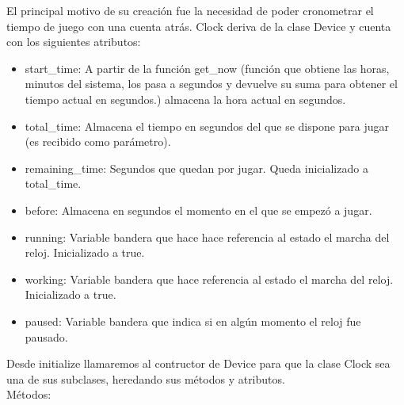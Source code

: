El principal motivo de su creación fue la necesidad de poder cronometrar el tiempo de juego con una cuenta atrás.
Clock deriva de la clase Device y cuenta con los siguientes atributos:

\begin{itemize}
 \item start\_time: A partir de la función get\_now (función que obtiene las horas, minutos del sistema, los pasa a segundos y devuelve su suma para 
obtener el tiempo actual en segundos.) almacena la hora actual en segundos.

 \item total\_time: Almacena el tiempo en segundos del que se dispone para jugar (es recibido como parámetro).
 
 \item remaining\_time: Segundos que quedan por jugar. Queda inicializado a total\_time.
 
 \item before: Almacena en segundos el momento en el que se empezó a jugar.
 
 \item running: Variable bandera que hace hace referencia al estado el marcha del reloj. Inicializado a true.
 
 \item working: Variable bandera que hace referencia al estado el marcha del reloj. Inicializado a true.
 
 \item paused: Variable bandera que indica si en algún momento el reloj fue pausado.
\end{itemize}

Desde initialize llamaremos al contructor de Device para que la clase Clock sea una de sus subclases, heredando sus métodos y atributos.\\

Métodos:

